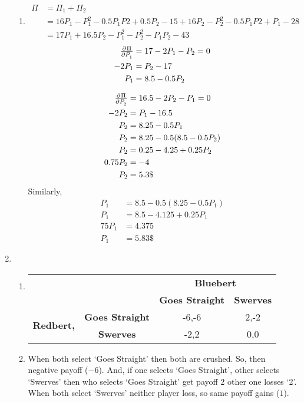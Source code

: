 \documentclass[a4paper,12pt]{article}
\begin{document}
\begin{enumerate}
\begin{enumerate}
\item
\begin{align*}
\Pi &= \Pi_1+\Pi_2\\
&= 16P_1-P_1^2-0.5P_1P2+0.5P_2-15+16P_2-P_2^2-0.5P_1P2+P_1-28\\
&=17P_1+16.5P_2-P_1^2-P_2^2-P_1P_2-43
\end{align*}
\begin{align*}
\pd{\Pi}{P_1} &= 17-2P_1-P_2=0\\
-2P_1 &= P_2-17\\
P_1 &= 8.5-0.5P_2
\end{align*}

\begin{align*}
\pd{\Pi}{P_2} &= 16.5-2P_2-P_1=0\\
-2P_2 &= P_1-16.5\\
P_2 &= 8.25-0.5P_1\\
P_2 &= 8.25-0.5(8.5-0.5P_2)\\
P_2 &= 0.25-4.25+0.25P_2\\
0.75P_2 & = -4\\
P_2 &= 5.3\$
\end{align*}
Similarly, 
\begin{align*}
P_1 &= 8.5-0.5(8.25-0.5P_1)\\
P_1 &= 8.5-4.125+0.25P_1\\
75P_1 &= 4.375\\
P_1 &= 5.83\$
\end{align*}
\end{enumerate}

\item%
\begin{enumerate}
\item
\begin{table}[H]
\centering
\begin{tabular}{@{}cccc@{}}
\toprule
\multicolumn{2}{c}{} & \multicolumn{2}{c}{\bfseries Bluebert}\\
\multicolumn{2}{c}{} & \textbf{Goes Straight} & \textbf{Swerves}\\
\multirow{2}{*}{\bfseries Redbert,} & \textbf{Goes Straight} & -6,-6 & 2,-2\\
 & \textbf{Swerves} & -2,2 & 0,0\\
\bottomrule
\end{tabular}
\end{table}

\item
When both select `Goes Straight' then both are crushed. So, then negative payoff ($-6$). And, if one selects `Goes Straight', other selects `Swerves' then who selects `Goes Straight' get payoff $2$ other one losses `2'. When both select `Swerves' neither player loss, so same payoff gains ($1$).


\end{enumerate}
\end{enumerate}
\end{document}

